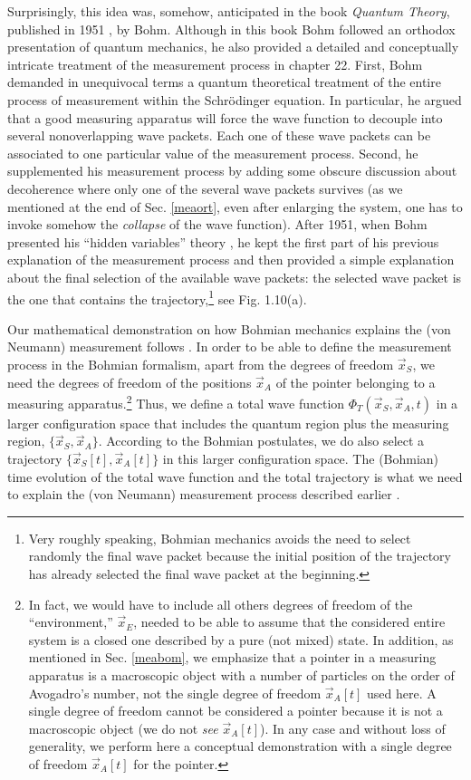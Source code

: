 \documentclass[nofootinbib, secnumarabic, amsmath, nobibnotes,11pt,aps,pra, floatfix]{revtex4-1}
\newcommand{\sref}[1]{Sec. \ref{#1}}
\begin{document}
Surprisingly, this idea was, somehow, anticipated in the book
\textit{Quantum Theory}, published in 1951 \cite{om.bohmbook}, by
Bohm. Although in this book Bohm followed an orthodox presentation
of quantum mechanics, he also provided a detailed and conceptually
intricate treatment of the measurement process in chapter 22. First,
Bohm demanded in unequivocal terms a quantum theoretical treatment
of the entire process of measurement within the Schr\"odinger
equation. In particular, he argued that a good measuring apparatus
will force the wave function to decouple into several nonoverlapping
wave packets. Each one of these wave packets can be associated to
one particular value of the measurement process. Second, he
supplemented his measurement process by adding some obscure
discussion about decoherence where only one of the several wave
packets survives (as we mentioned at the end of \sref{meaort}, even after enlarging the system, one has to invoke somehow the \emph{collapse} of the wave function). After 1951, when Bohm presented his ``hidden
variables'' theory \cite{om.bohm1952a,om.bohm1952b}, he kept the
first part of his previous explanation of the measurement process
and then provided a simple explanation about the final selection of
the available wave packets: the selected wave packet is the one that
contains the trajectory,\footnote{Very roughly speaking, Bohmian
mechanics avoids the need to select randomly the final wave packet
because the initial position of the trajectory has already selected the final wave packet at the beginning.} see Fig. 1.10(a).\enlargethispage{1pc}

Our mathematical demonstration on how Bohmian mechanics explains the (von Neumann) measurement follows 
\cite{om.Holand1993,om.bomhhiley1993,om.Durrnaive,om.Durrllibre,om.llibreph}. In
order to be able to define the measurement process in the Bohmian
formalism, apart from the degrees of freedom $\vec x_S$, we need the
degrees of freedom of the positions $\vec x_A$ of the pointer belonging to a measuring apparatus.\footnote{In fact, we would have
to include all others degrees of freedom of the ``environment,''
${\vec x_E}$, needed to be able to assume that the considered entire
system is a closed one described by a pure (not mixed)
state. In addition, as mentioned in \sref{meabom}, we emphasize that a pointer in a measuring apparatus is a macroscopic object with a number of particles on the order of Avogadro's number, not the single degree of freedom $\vec x_A[t]$ used here. A single degree of freedom cannot be considered a pointer because it is not a macroscopic object (we do not \emph{see} $\vec x_A[t]$). In any case and without loss of generality, we perform here a conceptual demonstration with a single degree of freedom $\vec x_A[t]$ for the pointer.} Thus, we define a total wave function
$\Phi_T(\vec x_S,\vec x_A,t)$ in a larger configuration space that
includes the quantum region plus the measuring region, $\{\vec
x_S,\vec x_A\}$. According to the Bohmian postulates, we do also
select a trajectory $\{\vec x_S[t],\vec x_A[t]\}$ in this larger
configuration space. The (Bohmian) time evolution of the total wave
function and the total trajectory is what we need to explain the (von Neumann) measurement process
described earlier .
\end{document}
